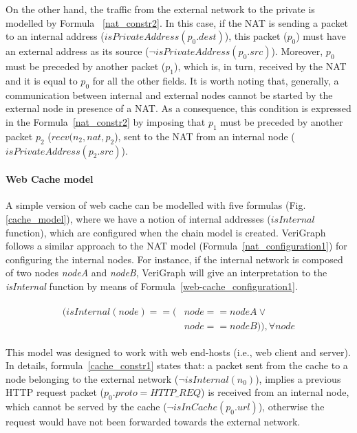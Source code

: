 On the other hand, the traffic from the external network to the private is modelled by Formula ~\ref{nat_constr2}. In this case, if the NAT is sending a packet to an internal address (\textit{$isPrivateAddress(p_{0}.dest)$}), this packet (\textit{$p_0$}) must have an external address as its source (\textit{$\neg isPrivateAddress(p_{0}.src)$}). Moreover, \textit{$p_0$} must be preceded by another packet (\textit{$p_1$}), which is, in turn, received by the NAT and it is equal to \textit{$p_0$} for all the other fields. It is worth noting that, generally, a communication between internal and external nodes cannot be started by the external node in presence of a NAT. As a consequence, this condition is expressed in the Formula~\ref{nat_constr2} by imposing that \textit{$p_1$} must be preceded by another packet \textit{$p_2$} (\textit{$ recv(n_{2}, nat, p_{2}$}), sent to the NAT from an internal node (\textit{$isPrivateAddress(p_{2}.src)$}).

\paragraph{Web Cache model} A simple version of web cache can be modelled with five formulas (Fig. \ref{cache_model}), where we have a notion of internal addresses (\textit{$isInternal$} function), which are configured when the chain model is created. VeriGraph follows a similar approach to the NAT model (Formula~\ref{nat_configuration1}) for configuring the internal nodes. For instance, if the internal network is composed of two nodes \textit{nodeA} and \textit{nodeB}, VeriGraph will give an interpretation to the \textit{isInternal} function by means of Formula~\ref{web-cache_configuration1}.
\begin{figure}[h]
	{\footnotesize
		\begin{subequations}
			\begin{align}
				\begin{split}
					\label{web-cache_configuration1}
					(isInternal(node) == (& node == nodeA \vee \\
					& node == nodeB)), \forall node
				\end{split}
			\end{align}
		\end{subequations}
	}%
\end{figure}

This model was designed to work with web end-hosts (i.e., web client and server). In details, formula~\ref{cache_constr1} states that: a packet sent from the cache to a node belonging to the external network (\textit{$\neg isInternal(n_{0})$}), implies a previous HTTP request packet (\textit{$p_{0}.proto = HTTP\_REQ$}) is received from an internal node, which cannot be served by the cache (\textit{$\neg isInCache(p_{0}.url)$}), otherwise the request would have not been forwarded towards the external network. 

